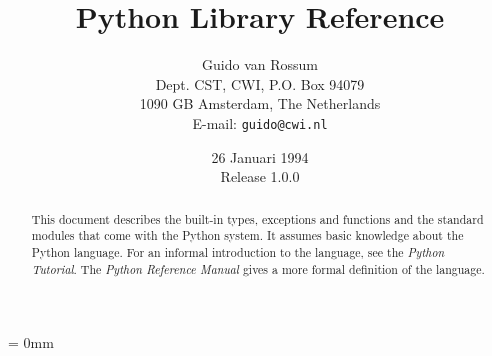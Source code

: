 
\title{Python Library Reference}

\author{
	Guido van Rossum \\
	Dept. CST, CWI, P.O. Box 94079 \\
	1090 GB Amsterdam, The Netherlands \\
	E-mail: {\tt guido@cwi.nl}
}

\date{26 Januari 1994 \\ Release 1.0.0} %

\makeindex			%





\maketitle

\begin{abstract}

\noindent
This document describes the built-in types, exceptions and functions
and the standard modules that come with the Python system.  It assumes
basic knowledge about the Python language.  For an informal
introduction to the language, see the {\em Python Tutorial}.  The {\em
Python Reference Manual} gives a more formal definition of the
language.

\end{abstract}

\pagebreak

{
\parskip = 0mm
\tableofcontents
}

\pagebreak
































